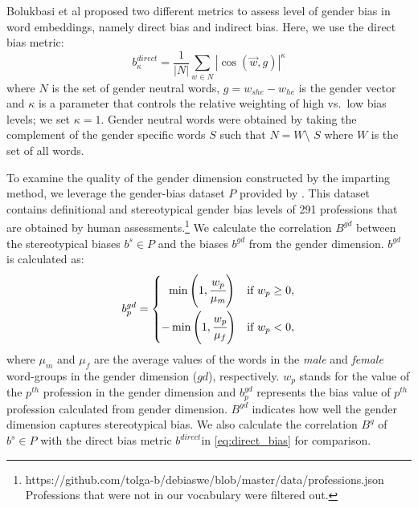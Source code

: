 \documentclass[11pt,a4paper]{article}
\begin{document}
Bolukbasi et al \citep{bolukbasi16debiasing} proposed two different metrics to assess level of gender bias in word embeddings, namely direct bias and indirect bias. Here, we use the direct bias metric:
\begin{equation}
b^{direct}_\kappa = \frac{1}{|N|}\sum_{w\in N}|\cos(\vec{w},g)|^\kappa
\label{eq:direct_bias}
\end{equation}
where $N$ is the set of gender neutral words,
$g= w_{she} - w_{he}$ is the gender vector
and $\kappa$ is a parameter that
controls the relative weighting of high vs.\ low bias
levels; we set $\kappa=1$. Gender
neutral words were obtained by taking the complement of the
gender specific words $S$ such that $N = W$\textbackslash
$S$ where $W$ is the set of all words.

To examine the quality of the gender dimension constructed
by the imparting method, we leverage the gender-bias
dataset $P$ provided by \citet{bolukbasi16debiasing}. This
dataset contains definitional and stereotypical gender bias
levels of 291 professions that are obtained by human
assessments.\footnote{https://github.com/tolga-b/debiaswe/blob/master/data/professions.json\\Professions
  that were not in our vocabulary were filtered out.} We
calculate the correlation $B^{gd}$ between the stereotypical biases
$b^s \in P$  and the biases
$b^{gd}$ from
the gender dimension. $b^{gd}$ is calculated as:
\begin{align}
\begin{split}
     b^{gd}_p = 
     \begin{cases}
		~~\min \left( 1, \cfrac{w_{p}}{\mu_m} \right) & \text{if } w_{p} \geq 0, \vspace{0.1cm} \\ 
		-\min \left( 1, \cfrac{w_{p}}{\mu_f} \right) & \text{if } w_{p} < 0,
	\end{cases}
\end{split}
\label{eq:measure_bias}
\end{align}
where $\mu_m$ and $\mu_f$ are the average values of the
words in the \textit{male} and \textit{female} word-groups
in the gender dimension ($gd$), respectively. $w_p$ stands
for the value of the $p^{th}$ profession in the gender
dimension and $b^{gd}_p$ represents the bias value of
$p^{th}$ profession calculated from gender
dimension. $B^{gd}$ indicates how well the gender dimension
captures stereotypical bias. We also calculate the
correlation $B^g$ of $b^s \in P$  with the direct bias metric
$b^{direct}$in \eqref{eq:direct_bias} for comparison.
\end{document}
